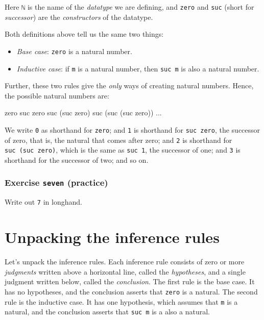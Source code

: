 Here \texttt{ℕ} is the name of the \emph{datatype} we are defining, and
\texttt{zero} and \texttt{suc} (short for \emph{successor}) are the
\emph{constructors} of the datatype.

Both definitions above tell us the same two things:

\begin{itemize}
\tightlist
\item
  \emph{Base case}: \texttt{zero} is a natural number.
\item
  \emph{Inductive case}: if \texttt{m} is a natural number, then
  \texttt{suc\ m} is also a natural number.
\end{itemize}

Further, these two rules give the \emph{only} ways of creating natural
numbers. Hence, the possible natural numbers are:

\begin{myDisplay}
zero
suc zero
suc (suc zero)
suc (suc (suc zero))
...
\end{myDisplay}

We write \texttt{0} as shorthand for \texttt{zero}; and \texttt{1} is
shorthand for \texttt{suc\ zero}, the successor of zero, that is, the
natural that comes after zero; and \texttt{2} is shorthand for
\texttt{suc\ (suc\ zero)}, which is the same as \texttt{suc\ 1}, the
successor of one; and \texttt{3} is shorthand for the successor of two;
and so on.

\hypertarget{Naturals-seven}{%
\subsubsection{\texorpdfstring{Exercise \texttt{seven}
(practice)}{Exercise seven (practice)}}\label{Naturals-seven}}

Write out \texttt{7} in longhand.

\begin{fence}
\begin{code}%
\>[0]\<%
\end{code}
\end{fence}

\hypertarget{unpacking-the-inference-rules}{%
\section{Unpacking the inference
rules}\label{unpacking-the-inference-rules}}

Let's unpack the inference rules. Each inference rule consists of zero
or more \emph{judgments} written above a horizontal line, called the
\emph{hypotheses}, and a single judgment written below, called the
\emph{conclusion}. The first rule is the base case. It has no
hypotheses, and the conclusion asserts that \texttt{zero} is a natural.
The second rule is the inductive case. It has one hypothesis, which
assumes that \texttt{m} is a natural, and the conclusion asserts that
\texttt{suc\ m} is a also a natural.

